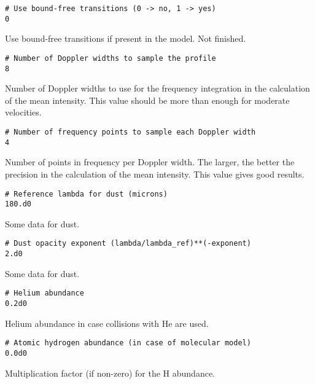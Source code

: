 \documentclass[12pt]{article}
\begin{document}
\begin{footnotesize} \begin{verbatim}
# Use bound-free transitions (0 -> no, 1 -> yes)
0
\end{verbatim} \end{footnotesize}
Use bound-free transitions if present in the model. Not finished.

\begin{footnotesize} \begin{verbatim}
# Number of Doppler widths to sample the profile
8
\end{verbatim} \end{footnotesize}
Number of Doppler widths to use for the frequency integration in the
calculation of the mean intensity. This value should be more than enough
for moderate velocities.

\begin{footnotesize} \begin{verbatim}
# Number of frequency points to sample each Doppler width
4
\end{verbatim} \end{footnotesize}
Number of points in frequency per Doppler width. The larger, the better
the precision in the calculation of the mean intensity. This value gives good
results.

\begin{footnotesize} \begin{verbatim}
# Reference lambda for dust (microns)
180.d0
\end{verbatim} \end{footnotesize}
Some data for dust.

\begin{footnotesize} \begin{verbatim}
# Dust opacity exponent (lambda/lambda_ref)**(-exponent)
2.d0
\end{verbatim} \end{footnotesize}
Some data for dust.

\begin{footnotesize} \begin{verbatim}
# Helium abundance
0.2d0
\end{verbatim} \end{footnotesize}
Helium abundance in case collisions with He are used.

\begin{footnotesize} \begin{verbatim}
# Atomic hydrogen abundance (in case of molecular model)
0.0d0
\end{verbatim} \end{footnotesize}
Multiplication factor (if non-zero) for the H abundance.
\end{document}
